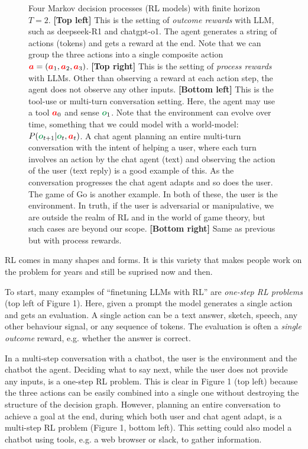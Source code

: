 \documentclass{article}
\newcommand{\colsym}[2]{\ensuremath{\textcolor{#1}{\boldsymbol{#2}}}}
\newcommand{\action}{\colsym{red}{a}}
\newcommand{\obs}{\colsym{ForestGreen}{o}}
\begin{document}
\begin{figure}[h!]
    \caption{Four Markov decision processes (RL models) with finite horizon $T=2$. {\bf [Top left]} This is the setting of \emph{outcome rewards} with LLM, such as deepseek-R1 and chatgpt-o1. The agent generates a string of actions (tokens) and gets a reward at the end. Note that we can group the three actions into a single composite action $\action = (\action_1,\action_2,\action_3)$. {\bf [Top right]} This is the setting of \emph{process rewards} with LLMs. Other than observing a reward at each action step, the agent does not observe any other inputs. {\bf [Bottom left]} This is the tool-use or multi-turn conversation setting. Here, the agent may use a tool $\action_0$ and sense $\obs_1$. Note that the environment can evolve over time, something that we could model with a world-model: $P(\obs_{t+1}|\obs_{t},\action_t)$. A chat agent planning an entire multi-turn conversation with the intent of helping a user, where each turn involves an action by the chat agent (text) and observing the action of the user (text reply) is a good example of this. As the conversation progresses the chat agent adapts and so does the user.
    The game of Go is another example. In both of these, the user is the environment. In truth, if the user is adversarial or manipulative, we are outside the realm of RL and in the world of game theory, but such cases are beyond our scope. {\bf [Bottom right]} Same as previous but with process rewards. }

   
\end{figure}

RL comes in many shapes and forms. It is this variety that makes people work on the problem for years and still be suprised now and then.

To start, many examples of ``finetuning LLMs with RL''
 are \emph{one-step RL problems} (top left of Figure 1). Here, given a prompt the model generates a single action and gets an evaluation. A single action can be a text answer, sketch, speech, any other behaviour signal, or any sequence of tokens. The evaluation is often a \emph{single outcome} reward, e.g. whether the answer is correct.
 
 In a multi-step conversation with a chatbot, the user is the environment and the chatbot the agent. Deciding what to say next, while the user does not provide any inputs, is a one-step RL problem. This is clear in Figure 1 (top left) because the three actions can be easily combined into a single one without destroying the structure of the decision graph. However, planning an entire conversation to achieve a goal at the end, during which both user and chat agent adapt, is a multi-step RL problem (Figure 1, bottom left). This setting could also model a chatbot using tools, e.g. a web browser or slack, to gather information.
\end{document}
